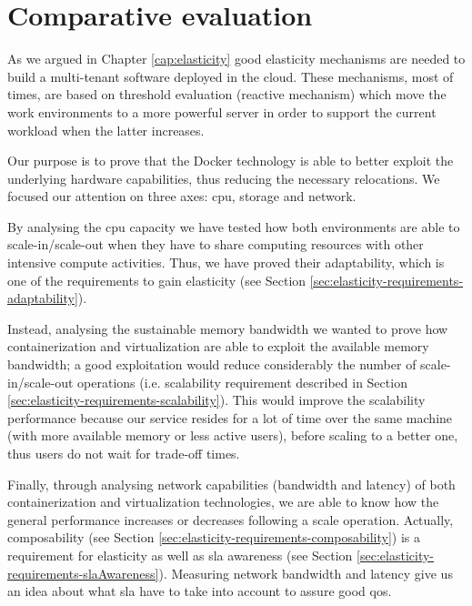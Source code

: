 %
%
\chapter{Comparative evaluation}
\label{cap:measurements}
As we argued in Chapter \ref{cap:elasticity} good elasticity mechanisms are needed to build a multi-tenant
software deployed in the cloud. These mechanisms, most of times, are based on threshold
evaluation (reactive mechanism) which move the work environments to a more powerful server in order
to support the current workload when the latter increases.

Our purpose is to prove that the Docker technology is able to better exploit the underlying hardware
capabilities, thus reducing the necessary relocations. We focused our attention on three axes: \acs{cpu},
storage and network.

By analysing the \acs{cpu} capacity we have tested how both environments are able to scale-in/scale-out
when they have to share computing resources with other intensive compute activities. Thus, we have proved
their adaptability, which is one of the requirements to gain elasticity (see Section 
\ref{sec:elasticity-requirements-adaptability}).

Instead, analysing the sustainable memory bandwidth we wanted to prove how containerization and virtualization
are able to exploit the available memory bandwidth; a good exploitation would reduce considerably the
number of scale-in/scale-out operations (i.e. scalability requirement described in Section 
\ref{sec:elasticity-requirements-scalability}). This would improve the scalability performance because
our service resides for a lot of time over the same machine (with more available memory or less active
users), before scaling to a better one, thus users do not wait for trade-off times.

Finally, through analysing network capabilities (bandwidth and latency) of both containerization and
virtualization technologies, we are able to know how the general performance increases or decreases
following a scale operation. Actually, composability (see Section 
\ref{sec:elasticity-requirements-composability}) is a requirement for elasticity as well as \ac{sla} 
awareness (see Section \ref{sec:elasticity-requirements-slaAwareness}). Measuring network bandwidth
and latency give us an idea about what \ac{sla} have to take into account to assure good \ac{qos}.

